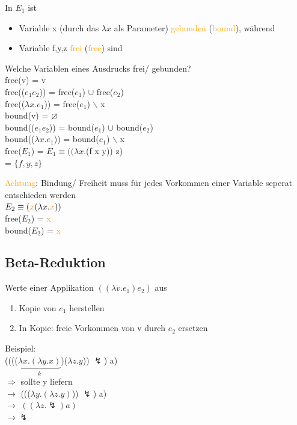 \documentclass[paper=a4, fontsize=11pt]{scrartcl}
\numberwithin{equation}{section}
\numberwithin{figure}{section}
\numberwithin{table}{section}
\begin{document}
\begin{lstlistig}
In $E_{1}$ ist
\begin{itemize}
\item Variable x (durch das $\lambda x$ als Parameter) \textcolor{orange}{gebunden} (\textcolor{orange}{bound}), während
\item Variable f,y,z \textcolor{orange}{frei} (\textcolor{orange}{free}) sind
\end{itemize}

Welche Variablen eines Ausdrucks frei/ gebunden? \\
free(v) = {v} \\
free(($e_{1} e_{2}$)) = free($e_{1}$) $\cup$ free($e_{2}$) \\
free(($\lambda x.e_{1}$)) = free($e_{1}$) $\backslash$ {x} \\

bound(v) = $\varnothing$ \\
bound(($e_{1} e_{2}$)) = bound($e_{1}$) $\cup$ bound($e_{2}$) \\
bound(($\lambda x.e_{1}$)) = bound($e_{1}$) $\backslash$ {x} \\

free($E_{1}$) = $E_{1} \equiv ((\lambda x.$(f x y)) z) \\
= $\{ f,y,z \}$

\textcolor{orange}{Achtung}: Bindung/ Freiheit muss für jedes Vorkommen einer Variable seperat entschieden werden \\

$E_{2} \equiv (\textcolor{orange}{x} (\lambda x.\textcolor{orange}{x}))$ \\
free($E_{2}$) = {\textcolor{orange}{x}} \\
bound($E_{2}$) = {\textcolor{orange}{x}}

\subsection{Beta-Reduktion}
Werte einer Applikation $((\lambda v.e_{1}) e_{2})$ aus 
\begin{enumerate}
\item Kopie von $e_{1}$ herstellen
\item In Kopie: freie Vorkommen von v durch $e_{2}$ ersetzen
\end{enumerate}

Beispiel: \\
(((($\underbrace{ \lambda x.(\lambda y.x)}_{k}$)($\lambda z.y$)) $\lightning$) a) \\
$\Rightarrow$ sollte y liefern \\
$\rightarrow$ ((($\lambda y.(\lambda z.y)$)) $\lightning$) a) \\
$\rightarrow$ $((\lambda z.\lightning) a)$ \\
$\rightarrow \lightning$ \\


\end{lstlistig}
\end{document}
